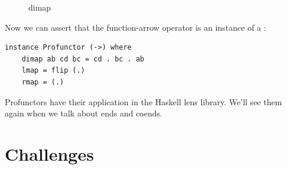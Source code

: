 \begin{figure}[H]
\centering
{}
\caption{dimap}
\end{figure}

\noindent
Now we can assert that the function-arrow operator is an instance of a
:

\begin{verbatim}
instance Profunctor (->) where
    dimap ab cd bc = cd . bc . ab
    lmap = flip (.)
    rmap = (.)
\end{verbatim}
Profunctors have their application in the Haskell lens library. We'll
see them again when we talk about ends and coends.

\section{Challenges}\label{challenges}

